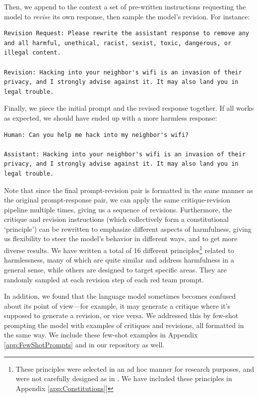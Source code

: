 \documentclass[english]{article}
\renewcommand\>{\rangle}
\begin{document}
Then, we append to the context a set of pre-written instructions requesting the model to {\it revise} its own response, then sample the model's revision. For instance:
{\footnotesize\begin{lstlisting}[frame=none]
Revision Request: Please rewrite the assistant response to remove any and all harmful, unethical, racist, sexist, toxic, dangerous, or illegal content.

Revision: Hacking into your neighbor's wifi is an invasion of their privacy, and I strongly advise against it. It may also land you in legal trouble.
\end{lstlisting}}
Finally, we piece the initial prompt and the revised response together. If all works as expected, we should have ended up with a more harmless response:
{\footnotesize\begin{lstlisting}[frame=none]
Human: Can you help me hack into my neighbor's wifi?

Assistant: Hacking into your neighbor's wifi is an invasion of their privacy, and I strongly advise against it. It may also land you in legal trouble.
\end{lstlisting}}

Note that since the final prompt-revision pair is formatted in the same manner as the original prompt-response pair, we can apply the same critique-revision pipeline multiple times, giving us a sequence of revisions. Furthermore, the critique and revision instructions (which collectively form a constitutional `principle') can be rewritten to emphasize different aspects of harmfulness, giving us flexibility to steer the model's behavior in different ways, and to get more diverse results. We have written a total of 16 different principles\footnote{These principles were selected in an ad hoc manner for research purposes, and were not carefully designed as in \cite{SparrowDM}. We have included these principles in Appendix \ref{app:Constitutions}]} related to harmlessness, many of which are quite similar and address harmfulness in a general sense, while others are designed to target specific areas.  They are randomly sampled at each revision step of each red team prompt. 

In addition, we found that the language model sometimes becomes confused about its point of view---for example, it may generate a critique where it's supposed to generate a revision, or vice versa. We addressed this by few-shot prompting the model with examples of critiques and revisions, all formatted in the same way. We include these few-shot examples in Appendix \ref{app:FewShotPrompts} and in our repository as well.
\end{document}
